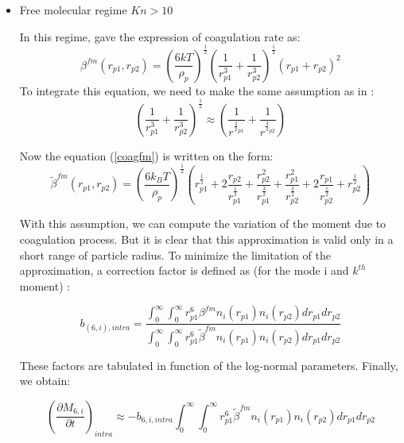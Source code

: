 \begin{itemize}
\item Free molecular regime $Kn > 10$

In this regime, \citet{Friedlander1977} gave the expression of coagulation rate 
as:
\begin{equation}
\beta^{fm}(r_{p1},r_{p2}) = \left(\frac{6 k 
T}{\rho_p}\right)^{\frac{1}{2}}\left(\frac{1}{r^3_{p1}} 
+ \frac{1}{r^3_{p2}}\right)^{\frac{1}{2}} (r_{p1} + r_{p2})^2 
\label{coagfm}
\end{equation}
To integrate this equation, we need to make the same assumption as in 
\citet{Lee1984}:
 \begin{equation}
\left(\frac{1}{r^3_{p1}} + \frac{1}{r^3_{p2}}\right)^{\frac{1}{2}} \approx 
\left(\frac{1}{r^{\frac{3}{2}_{p1}}} 
                                                               + 
\frac{1}{r^{\frac{3}{2}_{p2}}}\right)
\label{coag_ap}
\end{equation}

Now the equation (\ref{coagfm}) is written on the form:
\begin{equation}
\widetilde{\beta}^{fm}(r_{p1},r_{p2})
= \left(\frac{6 k_B T}{\rho_p}\right)^{\frac{1}{2}}
\left(r^{\frac{1}{2}}_{p1} + 2 \frac{r_{p2}}{r^{\frac{1}{2}}_{p1}} + 
\frac{r_{p2}^2}{r^{\frac{3}{2}}_{p1}} 
+ \frac{r_{p1}^2}{r^{\frac{3}{2}}_{p2}} +  2\frac{r_{p1}}{r^{\frac{1}{2}}_{p2}} 
+ r^{\frac{1}{2}}_{p2}\right)
\end{equation}

With this assumption, we can compute the variation of the moment due to 
coagulation process. But it is clear that this approximation is valid only in a 
short range of particle radius. To minimize the limitation of the 
approximation, a correction factor is defined 
as (for the mode i and $k^{th}$ moment) :


\begin{equation}
b_{(6,i),intra} = \frac{\int_{0}^{\infty} \int_{0}^{\infty} r_{p1}^6 \beta^{fm} 
n_i(r_{p1}) n_i(r_{p2}) dr_{p1} dr_{p2}}
{\int_{0}^{\infty} \int_{0}^{\infty} r_{p1}^6 \widetilde{\beta}^{fm} n_i(r_{p1}) 
n_i(r_{p2}) dr_{p1} dr_{p2}}
\end{equation}

These factors are tabulated  in function of the log-normal 
parameters.
Finally, we obtain:

\begin{equation}
(\frac{\partial M_{6,i}}{\partial t})_{intra}  \approx - b_{6,i,intra} 
\int_{0}^{\infty} \int_{0}^{\infty} r_{p1}^6 \widetilde{\beta}^{fm} n_i(r_{p1}) 
n_i(r_{p2}) dr_{p1} dr_{p2}
\end{equation}



\end{itemize}

